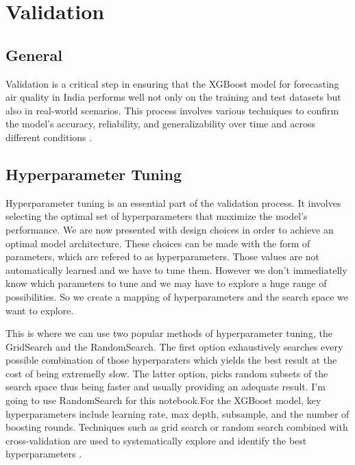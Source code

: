 %
%
%

\chapter{Validation}

\section{General}
Validation is a critical step in ensuring that the XGBoost model for forecasting
air quality in India performs well not only on the training and test datasets but
also in real-world scenarios. This process involves various techniques to
confirm the model's accuracy, reliability, and generalizability over time and
across different conditions \cite{Airqindia:2024}.

\section{Hyperparameter Tuning}
Hyperparameter tuning is an essential part of the validation process. It involves
selecting the optimal set of hyperparameters that maximize the model's performance.
We are now presented with design choices in order to achieve an optimal model
architecture. These choices can be made with the form of parameters, which are
refered to as hyperparameters. Those values are not automatically learned and we
have to tune them. However we don't immediatelly know which parameters to tune
and we may have to explore a huge range of possibilities. So we create a mapping
of hyperparameters and the search space we want to explore.

\bigskip

This is where we can use two popular methods of hyperparameter tuning, the GridSearch
and the RandomSearch. The first option exhaustively searches every possible
combination of those hyperparaters which yields the best result at the cost of
being extremelly slow. The latter option, picks random subsets of the search
space thus being faster and usually providing an adequate result. I'm going to use
RandomSearch for this notebook.For the XGBoost model, key hyperparameters
include learning rate, max depth, subsample, and the number of boosting rounds.
Techniques such as grid search or random search combined with cross-validation
are used to systematically explore and identify the best hyperparameters
\cite{Airqindia:2024}.

